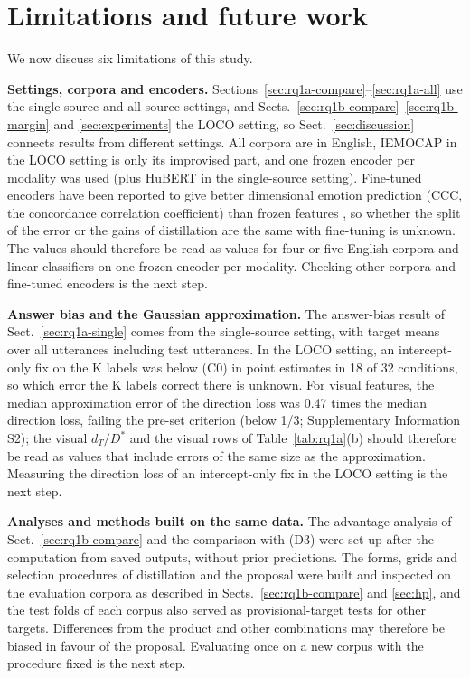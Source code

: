 \section{Limitations and future work}\label{sec:limitations}

We now discuss six limitations of this study.

\textbf{Settings, corpora and encoders.} Sections~\ref{sec:rq1a-compare}--\ref{sec:rq1a-all} use the single-source and all-source settings, and Sects.~\ref{sec:rq1b-compare}--\ref{sec:rq1b-margin} and \ref{sec:experiments} the LOCO setting, so Sect.~\ref{sec:discussion} connects results from different settings. All corpora are in English, IEMOCAP in the LOCO setting is only its improvised part, and one frozen encoder per modality was used (plus HuBERT in the single-source setting). Fine-tuned encoders have been reported to give better dimensional emotion prediction (CCC, the concordance correlation coefficient) than frozen features \cite{wagner2023}, so whether the split of the error or the gains of distillation are the same with fine-tuning is unknown. The values should therefore be read as values for four or five English corpora and linear classifiers on one frozen encoder per modality. Checking other corpora and fine-tuned encoders is the next step.

\textbf{Answer bias and the Gaussian approximation.} The answer-bias result of Sect.~\ref{sec:rq1a-single} comes from the single-source setting, with target means over all utterances including test utterances. In the LOCO setting, an intercept-only fix on the K labels was below (C0) in point estimates in 18 of 32 conditions, so which error the K labels correct there is unknown. For visual features, the median approximation error of the direction loss was 0.47 times the median direction loss, failing the pre-set criterion (below 1/3; Supplementary Information S2); the visual $d_T/D^{*}$ and the visual rows of Table~\ref{tab:rq1a}(b) should therefore be read as values that include errors of the same size as the approximation. Measuring the direction loss of an intercept-only fix in the LOCO setting is the next step.

\textbf{Analyses and methods built on the same data.} The advantage analysis of Sect.~\ref{sec:rq1b-compare} and the comparison with (D3) were set up after the computation from saved outputs, without prior predictions. The forms, grids and selection procedures of distillation and the proposal were built and inspected on the evaluation corpora as described in Sects.~\ref{sec:rq1b-compare} and \ref{sec:hp}, and the test folds of each corpus also served as provisional-target tests for other targets. Differences from the product and other combinations may therefore be biased in favour of the proposal. Evaluating once on a new corpus with the procedure fixed is the next step.

